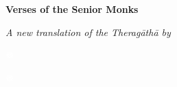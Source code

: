 \documentclass{article}
\begin{document}
\begin{minipage}[c][7in]{0.457in}
\centering
{}
\end{minipage}
\begin{minipage}[c][7in]{6.125in}

\begin{center}
\vfill

\huge\textbf{Verses of the Senior Monks}

\vfill

\large\textit{A new translation of the Theragāthā by}

\bigskip

\lowercase{}

\vfill
\end{center}


\end{minipage}
\fboxsep=0pt%
\colorbox{dark-pastel-green}{\parbox[c][1.125in][c]{1\textwidth}{%
\begin{minipage}[c][1.125in]{6.125in}
\centering \fboxrule=4pt%
\vspace{0.125in}
\end{minipage}\begin{minipage}[c][1.125in]{0.457in}
\centering \textcolor{white}{\Huge ☸}\vspace{0.125in}
\end{minipage}\begin{minipage}[c][1.125in]{6.125in}
\centering \textcolor{white}{\fontsize{40}{40}\selectfont ☸}\vspace{0.125in}
\end{minipage}
\endtabular}}%
\end{document}
